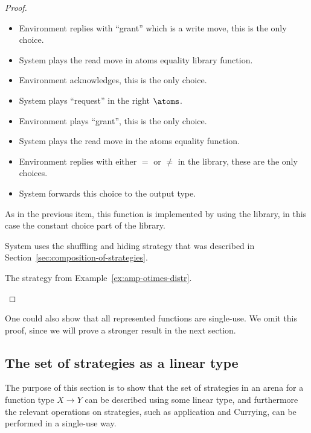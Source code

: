 \begin{proof}
\begin{description}
\begin{itemize}
    \item Environment replies with ``grant'' which is a write move, this is the only choice.
    \item System plays the read move in atoms equality library function.
    \item Environment acknowledges, this is the only choice.
    \item System plays  ``request'' in the right $\atoms$.
    \item Environment plays ``grant'', this is the only choice.
    \item System plays the read move in the atoms equality function.
    \item Environment replies with either $=$ or $\neq$ in the library, these are the only choices.
    \item System forwards this choice to the output type.
\end{itemize}
        

        \item[Constant function of type $1 \to \atoms$] As in the previous item, this function is implemented by using the library, in this case the constant choice part of the library. 

        \item[Projection of type $ X \otimes Y \to X$] System uses the  shuffling and hiding strategy that was described in Section~\ref{sec:composition-of-strategies}. 

        \item[Distributivity  of type $X \otimes (Y \& Z) \to (X \otimes Y) \& (X \otimes Z)$] The  strategy from Example~\ref{ex:amp-otimes-distr}.  
    \end{description}
\end{proof}
One could also show that all represented functions are single-use. We omit this proof, since we will prove a stronger result in the next section. 

\subsection{The set of strategies as a linear type}
The purpose of this section is to show that the set of strategies in an arena for a function type $X \to Y$ can be described using some linear type, and furthermore the relevant operations on strategies, such as application and Currying, can be performed in a single-use way.

